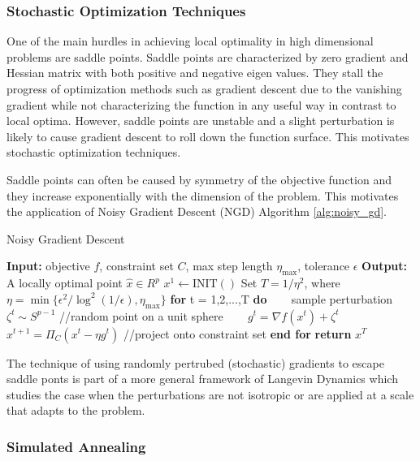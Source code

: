 \subsubsection{Stochastic Optimization Techniques}

One of the main hurdles in achieving local optimality in high dimensional problems are saddle points. Saddle points are characterized by zero gradient and Hessian matrix with both positive and negative eigen values. They stall the progress of optimization methods such as gradient descent due to the vanishing gradient while not characterizing the function in any useful way in contrast to local optima. However, saddle points are unstable and a slight perturbation is likely to cause gradient descent to roll down the function surface. This motivates stochastic optimization techniques.

Saddle points can often be caused by symmetry of the objective function and they increase exponentially with the dimension of the problem. This motivates the application of Noisy Gradient Descent (NGD) Algorithm \ref{alg:noisy_gd}.

\begin{algorithm}
\caption{Noisy Gradient Descent}
\label{alg:noisy_gd}
\begin{algorithmic}[1]
\STATE \textbf{Input:} objective $f$, constraint set $C$, max step length $\eta_{\max}$, tolerance $\epsilon$
\STATE \textbf{Output:} A locally optimal point $\hat{x} \in R^{p}$ 
\STATE $x^{1} \leftarrow \mathrm{INIT}()$
\STATE Set $T = 1/\eta^{2}$, where $\eta = \min\{\epsilon^{2}/\log^{2}(1/\epsilon),\eta_{\max}\}$
\STATE \textbf{for} t = 1,2,...,T \textbf{do}
\STATE ~~~ sample perturbation $\zeta^{t} \sim S^{p-1}$ //random point on a unit sphere
\STATE ~~~ $g^{t} = \nabla f(x^{t}) + \zeta^{t}$
\STATE ~~~ $x^{t+1} = \Pi_{C}(x^{t} - \eta g^{t})$ //project onto constraint set
\STATE \textbf{end for}
\STATE \textbf{return} $x^{T}$
\end{algorithmic}
\end{algorithm}

The technique of using randomly pertrubed (stochastic) gradients to escape saddle ponts is part of a more general framework of Langevin Dynamics which studies the case when the perturbations are not isotropic or are applied at a scale that adapts to the problem. 

\subsubsection{Simulated Annealing}

